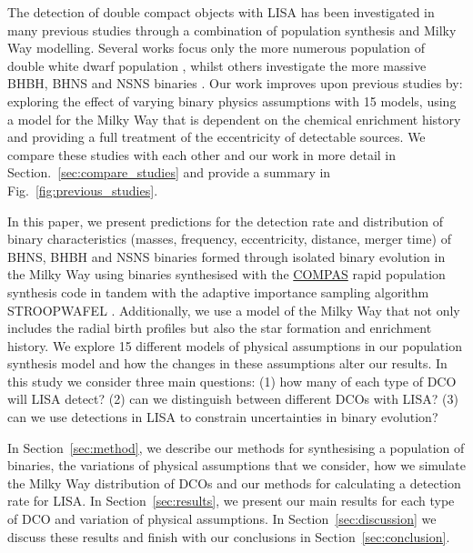 The detection of double compact objects with LISA has been investigated in many previous studies through a combination of population synthesis and Milky Way modelling. Several works focus only the more numerous population of double white dwarf population \citep{Ruiter+2010,Yu+2010,Nissanke+2012,Korol+2017,Lamberts+2018}, whilst others investigate the more massive BHBH, BHNS and NSNS binaries \citep{Nelemans+2001,Liu+2009,Belczynski+2010,Liu+2014,Lamberts+2019,Lau+2020,Breivik+2020,Sesana+2020}. Our work improves upon previous studies by: exploring the effect of varying binary physics assumptions with 15 models, using a model for the Milky Way that is dependent on the chemical enrichment history and providing a full treatment of the eccentricity of detectable sources. We compare these studies with each other and our work in more detail in Section.~\ref{sec:compare_studies} and provide a summary in Fig.~\ref{fig:previous_studies}.

In this paper, we present predictions for the detection rate and distribution of binary characteristics (masses, frequency, eccentricity, distance, merger time) of BHNS, BHBH and NSNS binaries formed through isolated binary evolution in the Milky Way using binaries synthesised with the \href{https://compas.science}{COMPAS} rapid population synthesis code \citep{Stevenson+2017, Vigna-Gomez+2018, Stevenson+2019} in tandem with the adaptive importance sampling algorithm STROOPWAFEL \citep{Broekgaarden+2019}. Additionally, we use a model of the Milky Way that not only includes the radial birth profiles but also the star formation and enrichment history. We explore 15 different models of physical assumptions in our population synthesis model and how the changes in these assumptions alter our results. In this study we consider three main questions: (1) how many of each type of DCO will LISA detect? (2) can we distinguish between different DCOs with LISA? (3) can we use detections in LISA to constrain uncertainties in binary evolution?

In Section~\ref{sec:method}, we describe our methods for synthesising a population of binaries, the variations of physical assumptions that we consider, how we simulate the Milky Way distribution of DCOs and our methods for calculating a detection rate for LISA. In Section~\ref{sec:results}, we present our main results for each type of DCO and variation of physical assumptions. In Section~\ref{sec:discussion} we discuss these results and finish with our conclusions in Section~\ref{sec:conclusion}.